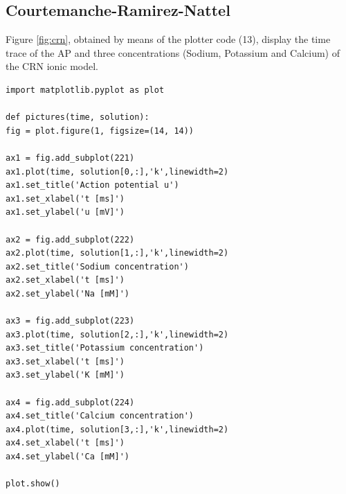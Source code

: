 \documentclass[11pt,a4paper]{article}
\begin{document}
\subsection{Courtemanche-Ramirez-Nattel}\label{sec:results_ap}
Figure \ref{fig:crn}, obtained by means of the plotter code (13), display the time trace of the AP and three concentrations (Sodium, Potassium and Calcium) of the CRN ionic model.  

\newpage
\lstset{language=Python}
\lstset{frame=lines}
\lstset{basicstyle=\footnotesize}
\begin{lstlisting}
import matplotlib.pyplot as plot  

def pictures(time, solution):
fig = plot.figure(1, figsize=(14, 14))

ax1 = fig.add_subplot(221)
ax1.plot(time, solution[0,:],'k',linewidth=2)
ax1.set_title('Action potential u')
ax1.set_xlabel('t [ms]')
ax1.set_ylabel('u [mV]')

ax2 = fig.add_subplot(222)
ax2.plot(time, solution[1,:],'k',linewidth=2)
ax2.set_title('Sodium concentration')
ax2.set_xlabel('t [ms]')
ax2.set_ylabel('Na [mM]')

ax3 = fig.add_subplot(223)
ax3.plot(time, solution[2,:],'k',linewidth=2)
ax3.set_title('Potassium concentration')
ax3.set_xlabel('t [ms]')
ax3.set_ylabel('K [mM]')

ax4 = fig.add_subplot(224)
ax4.set_title('Calcium concentration')
ax4.plot(time, solution[3,:],'k',linewidth=2)
ax4.set_xlabel('t [ms]')
ax4.set_ylabel('Ca [mM]')

plot.show()
\end{lstlisting}



\end{document}
